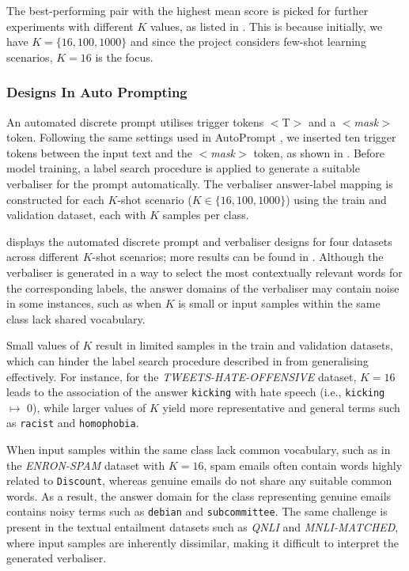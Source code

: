 The best-performing pair with the highest mean score is picked for further experiments with different $K$ values, as listed in . This is because initially, we have $K = \{16, 100, 1000\}$ and since the project considers few-shot learning scenarios, $K = 16$ is the focus. 


\vspace{-1.0em}
\subsubsection{Designs In Auto Prompting} \label{sec:eval-auto}
An automated discrete prompt utilises trigger tokens $<$T$>$ and a $<$\textit{mask}$>$ token. Following the same settings used in AutoPrompt \cite{shin2020autoprompt}, we inserted ten trigger tokens between the input text and the $<$\textit{mask}$>$ token, as shown in . Before model training, a label search procedure is applied to generate a suitable verbaliser for the prompt automatically. The verbaliser answer-label mapping is constructed for each  
$K$-shot scenario ($K \in \{16, 100, 1000\}$) using the train and validation dataset, each with $K$ samples per class.



\vspace{-0.6em}
 displays the automated discrete prompt and verbaliser designs for four datasets across different $K$-shot scenarios; more results can be found in . Although the verbaliser is generated in a way to select the most contextually relevant words for the corresponding labels, the answer domains of the verbaliser may contain noise in some instances, such as when $K$ is small or input samples within the same class lack shared vocabulary. 

Small values of $K$ result in limited samples in the train and validation datasets, which can hinder the label search procedure described in  from generalising effectively. For instance, for the \textit{TWEETS-HATE-OFFENSIVE} dataset, $K=16$ leads to the association of the answer \texttt{kicking} with hate speech (i.e., \texttt{kicking} $\mapsto$ 0), while larger values of $K$ yield more representative and general terms such as \texttt{racist} and \texttt{homophobia}.

When input samples within the same class lack common vocabulary, such as in the \textit{ENRON-SPAM} dataset with $K = 16$, spam emails often contain words highly related to \texttt{Discount}, whereas genuine emails do not share any suitable common words. As a result, the answer domain for the class representing genuine emails contains noisy terms such as \texttt{debian} and \texttt{subcommittee}. The same challenge is present in the textual entailment datasets such as \textit{QNLI} and \textit{MNLI-MATCHED}, where input samples are inherently dissimilar, making it difficult to interpret the generated verbaliser.

